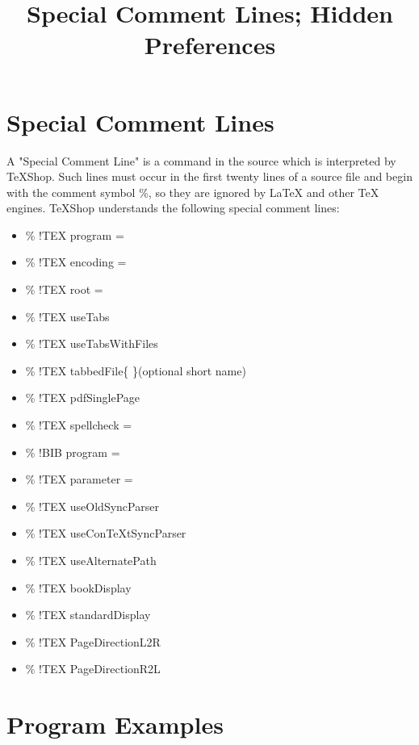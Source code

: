 \documentclass[11pt, oneside]{article}   	%
\title{Special Comment Lines; Hidden Preferences}
\date{}							%
\begin{document}
\maketitle
\section{Special Comment Lines}
A "Special Comment Line" is a command in the source which is interpreted by TeXShop. Such lines must occur in the first twenty lines of a source file and begin with the comment symbol \%, so they are ignored by LaTeX and other TeX engines.
TeXShop understands the following special comment lines:

\begin{itemize}
\item \% !TEX program =
\item \% !TEX encoding =
\item \% !TEX root =
\item \% !TEX useTabs
\item \% !TEX useTabsWithFiles
\item \% !TEX tabbedFile\{ \}(optional short name)
\item \% !TEX pdfSinglePage
\item \% !TEX spellcheck =
\item \% !BIB program =
\item \% !TEX parameter =
\item \% !TEX useOldSyncParser
\item \% !TEX useConTeXtSyncParser
\item \% !TEX useAlternatePath
\item \% !TEX bookDisplay
\item \% !TEX standardDisplay
\item \% !TEX PageDirectionL2R
\item	\% !TEX PageDirectionR2L
\end{itemize}

\section{Program Examples}
\end{document}
